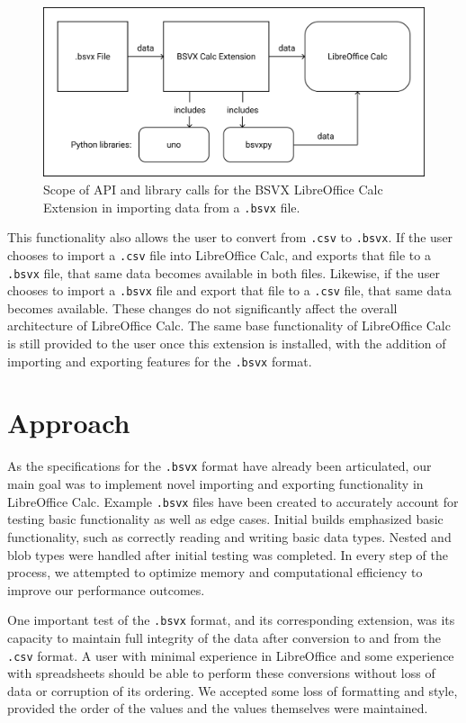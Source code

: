 \documentclass[10pt]{article}
\begin{document}
\begin{figure}[H]
\centering
\includegraphics[width=5in]{figures/bsvxToData.png}
\caption{Scope of API and library calls for the BSVX LibreOffice Calc Extension in importing data from a \texttt{.bsvx} file.}
\label{fig:deliverables_bsvxToData}
\end{figure}

\indent{}
This functionality also allows the user to convert from \texttt{.csv} to \texttt{.bsvx}.
If the user chooses to import a \texttt{.csv} file into LibreOffice Calc, and exports that file to a \texttt{.bsvx} file, that same data becomes available in both files.
Likewise, if the user chooses to import a \texttt{.bsvx} file and export that file to a \texttt{.csv} file, that same data becomes available.
These changes do not significantly affect the overall architecture of LibreOffice Calc.
The same base functionality of LibreOffice Calc is still provided to the user once this extension is installed, with the addition of importing and exporting features for the \texttt{.bsvx} format.

\section*{Approach}

As the specifications for the \texttt{.bsvx} format have already been articulated, our main goal was to implement novel importing and exporting functionality in LibreOffice Calc.
Example \texttt{.bsvx} files have been created to accurately account for testing basic functionality as well as edge cases.
Initial builds emphasized basic functionality, such as correctly reading and writing basic data types.
Nested and blob types were handled after initial testing was completed.
In every step of the process, we attempted to optimize memory and computational efficiency to improve our performance outcomes.

\indent{}
One important test of the \texttt{.bsvx} format, and its corresponding extension, was its capacity to maintain full integrity of the data after conversion to and from the \texttt{.csv} format.
A user with minimal experience in LibreOffice and some experience with spreadsheets should be able to perform these conversions without loss of data or corruption of its ordering.
We accepted some loss of formatting and style, provided the order of the values and the values themselves were maintained.
\end{document}

